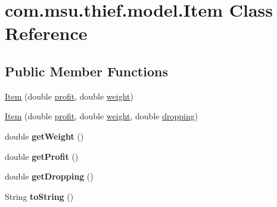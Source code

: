 \hypertarget{classcom_1_1msu_1_1thief_1_1model_1_1Item}{\section{com.\-msu.\-thief.\-model.\-Item Class Reference}
\label{classcom_1_1msu_1_1thief_1_1model_1_1Item}
}
\subsection*{Public Member Functions}
\begin{DoxyCompactItemize}
\item 
\hyperlink{classcom_1_1msu_1_1thief_1_1model_1_1Item_ac7b6aa0e8258962aceb32f64fb098548}{Item} (double \hyperlink{classcom_1_1msu_1_1thief_1_1model_1_1Item_a540f0be6af9387af62bf43bf2930a4da}{profit}, double \hyperlink{classcom_1_1msu_1_1thief_1_1model_1_1Item_a2a6b0a03bfff2ac46c09d972a52a063e}{weight})
\item 
\hyperlink{classcom_1_1msu_1_1thief_1_1model_1_1Item_a31e0ccadcc133e909e37347a3316c860}{Item} (double \hyperlink{classcom_1_1msu_1_1thief_1_1model_1_1Item_a540f0be6af9387af62bf43bf2930a4da}{profit}, double \hyperlink{classcom_1_1msu_1_1thief_1_1model_1_1Item_a2a6b0a03bfff2ac46c09d972a52a063e}{weight}, double \hyperlink{classcom_1_1msu_1_1thief_1_1model_1_1Item_acdbd5c173fae33c3f321caeed8a373df}{dropping})
\item 
\hypertarget{classcom_1_1msu_1_1thief_1_1model_1_1Item_a3ed58b8b54b8819a026651a4646acec5}{double {\bfseries get\-Weight} ()}\label{classcom_1_1msu_1_1thief_1_1model_1_1Item_a3ed58b8b54b8819a026651a4646acec5}

\item 
\hypertarget{classcom_1_1msu_1_1thief_1_1model_1_1Item_a884e3820b56b01474d5b49c86b45e045}{double {\bfseries get\-Profit} ()}\label{classcom_1_1msu_1_1thief_1_1model_1_1Item_a884e3820b56b01474d5b49c86b45e045}

\item 
\hypertarget{classcom_1_1msu_1_1thief_1_1model_1_1Item_a03d6c8ea96d614165efc37f0227d5c14}{double {\bfseries get\-Dropping} ()}\label{classcom_1_1msu_1_1thief_1_1model_1_1Item_a03d6c8ea96d614165efc37f0227d5c14}

\item 
\hypertarget{classcom_1_1msu_1_1thief_1_1model_1_1Item_a46c474b03929cae07e94eb5bfc95c8e1}{String {\bfseries to\-String} ()}\label{classcom_1_1msu_1_1thief_1_1model_1_1Item_a46c474b03929cae07e94eb5bfc95c8e1}

\end{DoxyCompactItemize}
